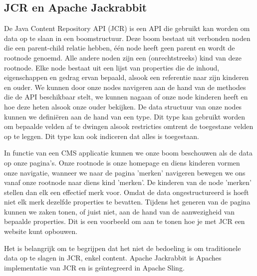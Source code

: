 
	\subsection{JCR en Apache Jackrabbit}
	De Java Content Repository API (JCR) is een API die gebruikt kan worden om data op te slaan in een boomstructuur. Deze boom bestaat uit verbonden noden die een parent-child relatie hebben, één node heeft geen parent en wordt de rootnode genoemd. Alle andere noden zijn een (onrechtstreeks) kind van deze rootnode. Elke node bestaat uit een lijst van properties die de inhoud, eigenschappen en gedrag ervan bepaald, alsook een referentie naar zijn kinderen en ouder. We kunnen door onze nodes navigeren aan de hand van de methodes die de API beschikbaar stelt, we kunnen nagaan of onze node kinderen heeft en hoe deze heten alsook onze ouder bekijken. De data structuur van onze nodes kunnen we defini\"eren aan de hand van een type. Dit type kan gebruikt worden om bepaalde velden af te dwingen alsook restricties omtrent de toegestane velden op te leggen. Dit type kan ook indiceren dat alles is toegestaan. 
	\par
	In functie van een CMS applicatie kunnen we onze boom beschouwen als de data op onze pagina's. Onze rootnode is onze homepage en diens kinderen vormen onze navigatie, wanneer we naar de pagina 'merken' navigeren bewegen we ons vanaf onze rootnode naar diens kind 'merken'. De kinderen van de node 'merken' stellen dan elk een effectief merk voor. Omdat de data ongestructureerd is hoeft niet elk merk dezelfde properties te bevatten. Tijdens het generen van de pagina kunnen we zaken tonen, of juist niet, aan de hand van de aanwezigheid van bepaalde properties. Dit is een voorbeeld om aan te tonen hoe je met JCR een website kunt opbouwen.
	\par
	Het is belangrijk om te begrijpen dat het niet de bedoeling is om traditionele data op te slagen in JCR, enkel content. Apache Jackrabbit is Apaches implementatie van JCR en is ge\"integreerd in Apache Sling.
